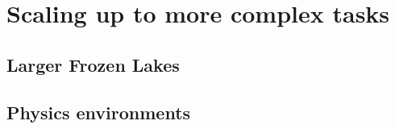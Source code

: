 
\chapter{Scaling up to more complex tasks} %

\label{Chapter7} %



\section{Larger Frozen Lakes}


\section{Physics environments}


